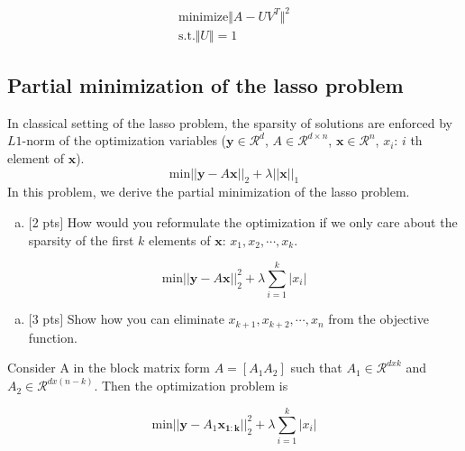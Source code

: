\documentclass[12pt]{article}
\begin{document}
\begin{align*}
\text{minimize} \Vert A- UV^T \Vert^{2} \\
\text{s.t.} \Vert U\Vert = 1 
\end{align*}


\vspace{.25cm}

\subsection{Partial minimization of the lasso problem}

In classical setting of the lasso problem, the sparsity of solutions are enforced by $L1$-norm of the optimization variables ($\mathbf{y} \in \mathcal{R}^{d}$, $A \in \mathcal{R}^{d\times n}$, $\mathbf{x}\in \mathcal{R}^{n}$, $x_{i}$: $i$ th element of $\mathbf{x}$).
\begin{equation}
	\text{min}||\mathbf{y}-A\mathbf{x}||_{2}+\lambda ||\mathbf{x}||_{1}
	\label{lasso}
	\nonumber
\end{equation}
In this problem, we derive the partial minimization of the lasso problem.

\begin{enumerate}[(a)]
\item 
$[$2 pts$]$ How would you reformulate the optimization if we only care about the sparsity of the first $k$ elements of $\mathbf{x}$: $x_{1},x_{2},\cdots,x_{k}$. 
\end{enumerate}

\begin{equation}
	\text{min}||\mathbf{y}-A\mathbf{x}||_{2}^{2}+\lambda \sum_{i=1}^{k} |x_i|
	\label{lasso}
	\nonumber
\end{equation}


\vspace{.25cm}

\begin{enumerate}[(b)]
\item 
$[$3 pts$]$ Show how you can eliminate $x_{k+1},x_{k+2},\cdots,x_{n}$ from the objective function.
\end{enumerate}

Consider A in the block matrix form $A = [A_1 A_2]$ such that $A_1 \in \mathcal{R}^{dxk}$ and $A_2 \in \mathcal{R}^{dx(n-k)}$. Then the optimization problem is 

\begin{equation}
	\text{min}||\mathbf{y}-A_1\mathbf{x_{1:k}}||_{2}^{2}+\lambda \sum_{i=1}^{k} |x_i|
	\label{lasso}
	\nonumber
\end{equation}
\end{document}
